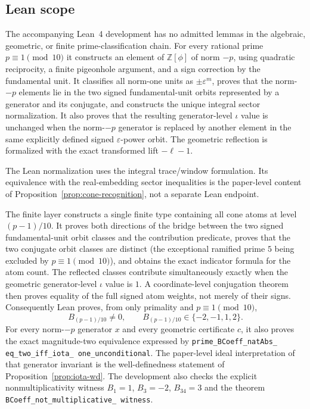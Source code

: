 \documentclass[12pt]{amsart}
\theoremstyle{definition}
\theoremstyle{remark}
\newcommand{\ZZ}{\mathbb{Z}}
\newcommand{\eps}{\varepsilon}
\begin{document}
\subsection{Lean scope}

The accompanying Lean~4 development has no admitted lemmas in the
algebraic, geometric, or finite prime-classification chain.  For every
rational prime $p\equiv1\pmod {10}$ it constructs an element of
$\ZZ[\phi]$ of norm $-p$, using quadratic reciprocity, a finite
pigeonhole argument, and a sign correction by the fundamental unit.
It classifies all norm-one units as $\pm\eps^m$, proves that the
norm-$-p$ elements lie in the two signed fundamental-unit orbits
represented by a generator and its conjugate, and constructs the unique
integral sector normalization.  It also proves that the resulting
generator-level $\iota$ value is unchanged when the norm-$-p$ generator is
replaced by another element in the same explicitly defined signed
$\eps$-power orbit.  The geometric
reflection is formalized with the exact transformed lift
$-\ell-1$.

The Lean normalization uses the integral trace/window formulation.  Its
equivalence with the real-embedding sector inequalities is the paper-level
content of Proposition~\ref{prop:cone-recognition}, not a separate Lean
endpoint.

The finite layer constructs a single finite type containing all cone
atoms at level $(p-1)/10$.  It proves both directions of the bridge
between the two signed fundamental-unit orbit classes and the contribution
predicate, proves that the two conjugate orbit classes are distinct (the
exceptional ramified prime $5$ being excluded by
$p\equiv1\pmod {10}$), and obtains the exact indicator formula for the atom
count.  The reflected classes contribute simultaneously exactly when the
geometric generator-level $\iota$ value is $1$.  A coordinate-level
conjugation theorem then proves equality of the full signed atom weights,
not merely of their signs.  Consequently Lean proves, from only primality
and $p\equiv1\pmod {10}$,
\[
 B_{(p-1)/10}\ne0,\qquad
 B_{(p-1)/10}\in\{-2,-1,1,2\}.
\]
For every norm-$-p$ generator $x$ and every geometric certificate $c$,
it also proves the exact magnitude-two equivalence expressed by
\texttt{prime\_\allowbreak BCoeff\_\allowbreak natAbs\_\allowbreak
eq\_\allowbreak two\_\allowbreak iff\_\allowbreak iota\_\allowbreak
one\_\allowbreak unconditional}.
The paper-level ideal interpretation of that generator invariant is the
well-definedness statement of Proposition~\ref{prop:iota-wd}.
The development also checks the explicit nonmultiplicativity witness
$B_1=1$, $B_3=-2$, $B_{34}=3$ and the theorem
\texttt{BCoeff\_\allowbreak not\_\allowbreak multiplicative\_\allowbreak
witness}.
\end{document}
